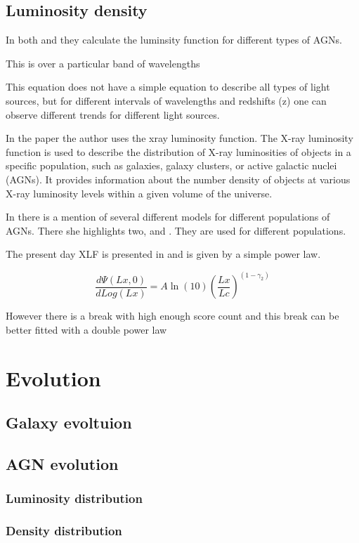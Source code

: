 \documentclass{article}
\begin{document}
 \subsection{Luminosity density}
 




In both \cite{Ajello_2009} and \cite{Ueda_2003} they calculate the luminsity function for different types of AGNs. 




This is over a particular band of wavelengths


This equation does not have a simple equation to describe all types of light sources, but for different intervals of wavelengths and redshifts (z) one can observe different trends for different light sources. 

In the paper \cite{Jacobsen:2015mga} the author uses the xray luminosity function. The X-ray luminosity function is used to describe the distribution of X-ray luminosities of objects in a specific population, such as galaxies, galaxy clusters, or active galactic nuclei (AGNs). It provides information about the number density of objects at various X-ray luminosity levels within a given volume of the universe.


In \cite{Jacobsen:2015mga} there is a mention of several different models for different populations of AGNs. There she highlights two, \cite{Ajello_2009} and \cite{Ueda_2003}. They are used for different populations.

The present day XLF is presented in \cite{Ajello_2009} and is given by a simple power law. 

\begin{equation}
    \frac{d\Psi(Lx,0)}{dLog(Lx)} = A\ln (10){(\frac{Lx}{Lc})}^{(1-\gamma_2)}
\end{equation}

However there is a break with high enough score count and this break can be better fitted with a double power law 



\section{Evolution}
\subsection{Galaxy evoltuion}
\subsection{AGN evolution}
\subsubsection{Luminosity distribution}
\subsubsection{Density distribution}
\end{document}
